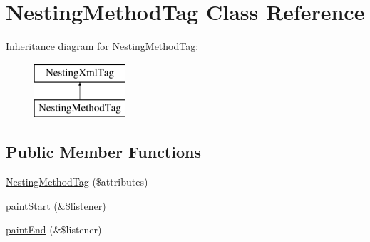 \hypertarget{class_nesting_method_tag}{
\section{NestingMethodTag Class Reference}
\label{class_nesting_method_tag}
}
Inheritance diagram for NestingMethodTag:\begin{figure}[H]
\begin{center}
\leavevmode
\includegraphics[height=2.000000cm]{class_nesting_method_tag}
\end{center}
\end{figure}
\subsection*{Public Member Functions}
\begin{DoxyCompactItemize}
\item 
\hyperlink{class_nesting_method_tag_a7f84bd600d310fea9b0ae676ba4f24d7}{NestingMethodTag} (\$attributes)
\item 
\hyperlink{class_nesting_method_tag_a9d29783caa420bbd786c51e1b400a481}{paintStart} (\&\$listener)
\item 
\hyperlink{class_nesting_method_tag_a15ed8db13ff62f4f3f7631212f1b6278}{paintEnd} (\&\$listener)
\end{DoxyCompactItemize}


